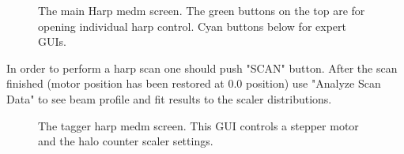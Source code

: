 \documentclass[12pt]{article}
\begin{document}
\begin{figure}[tbhp]
{\centering {} \par}
\caption{The main Harp medm screen. The green buttons on the top are for opening individual harp control. Cyan buttons below for expert GUIs.}
\label{harpmain}
\end{figure}

In order to perform a harp scan one should push "SCAN" button. After the scan finished (motor position has been restored at $0.0$ position) use "Analyze Scan Data" to see beam profile and fit results to the scaler distributions.
\begin{figure}[tbhp]
{\centering {} \par}
\caption{The tagger harp medm screen. This GUI controls a stepper motor and the halo counter scaler settings.}
\label{taggerharp}
\end{figure}
\end{document}
